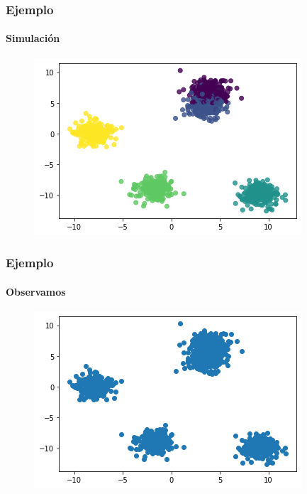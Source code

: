 \documentclass[
  shownotes,
  xcolor={svgnames},
  hyperref={colorlinks,citecolor=DarkBlue,linkcolor=DarkRed,urlcolor=DarkBlue}
  , aspectratio=169]{beamer}
\begin{document}
\begin{frame}
\frametitle{Ejemplo}
\framesubtitle{Simulación}


\begin{figure}[H] \centering

    \centering
    \includegraphics[scale=.7]{figures/cl_teoricos1.png}
  \\
  \tiny
\end{figure}


\end{frame}
\begin{frame}
\frametitle{Ejemplo}
\framesubtitle{Observamos}


\begin{figure}[H] \centering

    \centering
    \includegraphics[scale=.7]{figures/cl_teoricos2.png}
  \\
  \tiny
\end{figure}


\end{frame}
\end{document}
